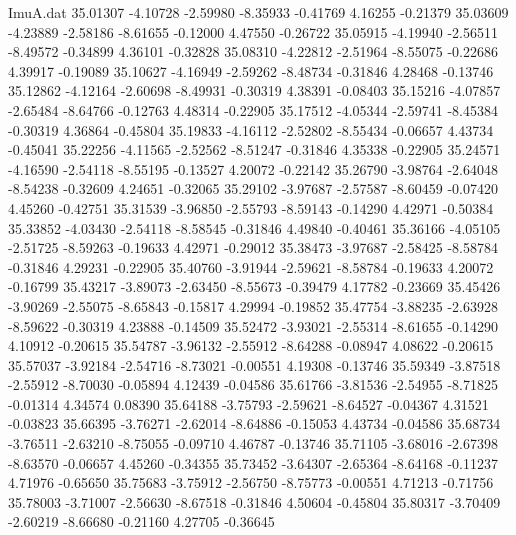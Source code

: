 \begin{filecontents}{ImuA.dat}
  35.01307   -4.10728   -2.59980   -8.35933   -0.41769    4.16255   -0.21379
  35.03609   -4.23889   -2.58186   -8.61655   -0.12000    4.47550   -0.26722
  35.05915   -4.19940   -2.56511   -8.49572   -0.34899    4.36101   -0.32828
  35.08310   -4.22812   -2.51964   -8.55075   -0.22686    4.39917   -0.19089
  35.10627   -4.16949   -2.59262   -8.48734   -0.31846    4.28468   -0.13746
  35.12862   -4.12164   -2.60698   -8.49931   -0.30319    4.38391   -0.08403
  35.15216   -4.07857   -2.65484   -8.64766   -0.12763    4.48314   -0.22905
  35.17512   -4.05344   -2.59741   -8.45384   -0.30319    4.36864   -0.45804
  35.19833   -4.16112   -2.52802   -8.55434   -0.06657    4.43734   -0.45041
  35.22256   -4.11565   -2.52562   -8.51247   -0.31846    4.35338   -0.22905
  35.24571   -4.16590   -2.54118   -8.55195   -0.13527    4.20072   -0.22142
  35.26790   -3.98764   -2.64048   -8.54238   -0.32609    4.24651   -0.32065
  35.29102   -3.97687   -2.57587   -8.60459   -0.07420    4.45260   -0.42751
  35.31539   -3.96850   -2.55793   -8.59143   -0.14290    4.42971   -0.50384
  35.33852   -4.03430   -2.54118   -8.58545   -0.31846    4.49840   -0.40461
  35.36166   -4.05105   -2.51725   -8.59263   -0.19633    4.42971   -0.29012
  35.38473   -3.97687   -2.58425   -8.58784   -0.31846    4.29231   -0.22905
  35.40760   -3.91944   -2.59621   -8.58784   -0.19633    4.20072   -0.16799
  35.43217   -3.89073   -2.63450   -8.55673   -0.39479    4.17782   -0.23669
  35.45426   -3.90269   -2.55075   -8.65843   -0.15817    4.29994   -0.19852
  35.47754   -3.88235   -2.63928   -8.59622   -0.30319    4.23888   -0.14509
  35.52472   -3.93021   -2.55314   -8.61655   -0.14290    4.10912   -0.20615
  35.54787   -3.96132   -2.55912   -8.64288   -0.08947    4.08622   -0.20615
  35.57037   -3.92184   -2.54716   -8.73021   -0.00551    4.19308   -0.13746
  35.59349   -3.87518   -2.55912   -8.70030   -0.05894    4.12439   -0.04586
  35.61766   -3.81536   -2.54955   -8.71825   -0.01314    4.34574    0.08390
  35.64188   -3.75793   -2.59621   -8.64527   -0.04367    4.31521   -0.03823
  35.66395   -3.76271   -2.62014   -8.64886   -0.15053    4.43734   -0.04586
  35.68734   -3.76511   -2.63210   -8.75055   -0.09710    4.46787   -0.13746
  35.71105   -3.68016   -2.67398   -8.63570   -0.06657    4.45260   -0.34355
  35.73452   -3.64307   -2.65364   -8.64168   -0.11237    4.71976   -0.65650
  35.75683   -3.75912   -2.56750   -8.75773   -0.00551    4.71213   -0.71756
  35.78003   -3.71007   -2.56630   -8.67518   -0.31846    4.50604   -0.45804
  35.80317   -3.70409   -2.60219   -8.66680   -0.21160    4.27705   -0.36645

\end{filecontents}
